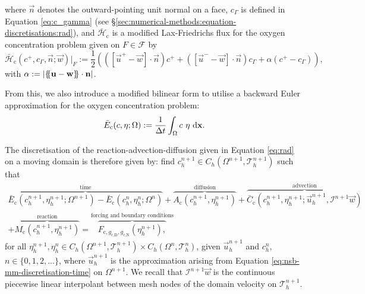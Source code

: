             where $\vec{n}$ denotes the outward-pointing unit normal on a face, $c_\Gamma$ is defined in Equation \eqref{eq:c_gamma} (see \S\ref{sec:numerical-methods:equation-discretisations:rad}), and $\bar{\mathcal{H}}_\text{c}$ is a modified Lax-Friedrichs flux for the oxygen concentration problem given on $F \in \mathcal{F}$ by
            \begin{equation}
                \bar{\mathcal{H}}_\text{c}(c^+, c_\Gamma, \vec{n}; \vec{w})|_F := \frac{1}{2}(([\vec{u}^+ - \vec{w}] \cdot \vec{n}) c^+ + ([\vec{u}^- - \vec{w}] \cdot \vec{n}) c_\Gamma + \alpha(c^+ - c_\Gamma)),
            \end{equation}
            with $\alpha := |\{\negthickspace\{\boldsymbol{\mathbf{u}} - \boldsymbol{\mathbf{w}}\}\negthickspace\} \cdot \boldsymbol{\mathbf{n}}|$.
            
            From this, we also introduce a modified bilinear form to utilise a backward Euler approximation for the oxygen concentration problem:
            \begin{equation}
                \bar{E}_\text{c}(c, \eta; \Omega) := \frac{1}{\Delta t} \int_\Omega c ~ \eta ~\mathrm{d} \boldsymbol{\mathbf{x}}.
            \end{equation}

            The discretisation of the reaction-advection-diffusion given in Equation \eqref{eq:rad} on a moving domain is therefore given by: find $c^{n+1}_h \in C_h(\Omega^{n+1}, \mathcal{T}^{n+1}_h)$ such that
            \begin{multline}
                \overbrace{\bar{E}_\text{c}(c^{n+1}_h, \eta^{n+1}_h; \Omega^{n+1}) - \bar{E}_\text{c}(c^n_h, \eta^n_h; \Omega^n)}^{\text{time}} + \overbrace{A_\text{c}(c^{n+1}_h, \eta^{n+1}_h)}^{\text{diffusion}} + \overbrace{\bar{C}_\text{c}(c^{n+1}_h, \eta^{n+1}_h; \vec{u}^{n+1}_h, \mathcal{I}^{n+1}\vec{w})}^{\text{advection}} \\ + \overbrace{M_\text{c}(c^{n+1}_h, \eta^{n+1}_h)}^{\text{reaction}} = \overbrace{F_{\text{c},g_\text{c,D},g_\text{c,N}}(\eta^{n+1}_h),}^{\text{forcing and boundary conditions}}
                \label{eq:mm-rad-discretisation}
            \end{multline}
            for all $\eta^{n+1}_h, \eta^n_h \in C_h(\Omega^{n+1}, \mathcal{T}^{n+1}_h) \times C_h(\Omega^n, \mathcal{T}^n_h)$, given $\vec{u}^{n+1}_h$ and $c^n_h$, $n \in \{0, 1, 2, ...\}$, where $\vec{u}^{n+1}_h$ is the approximation arising from Equation \eqref{eq:nsb-mm-discretisation-time} on $\Omega^{n+1}$. We recall that $\mathcal{I}^{n+1}\vec{w}$ is the continuous piecewise linear interpolant between mesh nodes of the domain velocity on $\mathcal{T}_h^{n+1}$.

